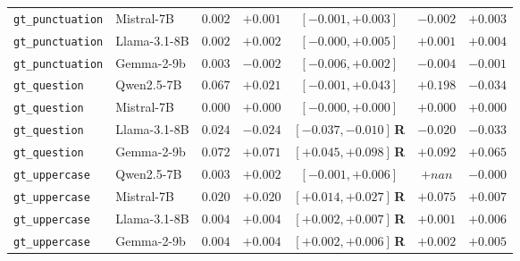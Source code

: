 \begin{table}[htbp]
\begin{tabular}{llccccc}
    \texttt{gt\_punctuation} & Mistral-7B & $0.002$ & $+0.001$ & $[-0.001, +0.003]$ & $-0.002$ & $+0.003$ \\
    \texttt{gt\_punctuation} & Llama-3.1-8B & $0.002$ & $+0.002$ & $[-0.000, +0.005]$ & $+0.001$ & $+0.004$ \\
    \texttt{gt\_punctuation} & Gemma-2-9b & $0.003$ & $-0.002$ & $[-0.006, +0.002]$ & $-0.004$ & $-0.001$ \\
    \texttt{gt\_question} & Qwen2.5-7B & $0.067$ & $+0.021$ & $[-0.001, +0.043]$ & $+0.198$ & $-0.034$ \\
    \texttt{gt\_question} & Mistral-7B & $0.000$ & $+0.000$ & $[-0.000, +0.000]$ & $+0.000$ & $+0.000$ \\
    \texttt{gt\_question} & Llama-3.1-8B & $0.024$ & $-0.024$ & $[-0.037, -0.010]$\,\textbf{R} & $-0.020$ & $-0.033$ \\
    \texttt{gt\_question} & Gemma-2-9b & $0.072$ & $+0.071$ & $[+0.045, +0.098]$\,\textbf{R} & $+0.092$ & $+0.065$ \\
    \texttt{gt\_uppercase} & Qwen2.5-7B & $0.003$ & $+0.002$ & $[-0.001, +0.006]$ & $+nan$ & $-0.000$ \\
    \texttt{gt\_uppercase} & Mistral-7B & $0.020$ & $+0.020$ & $[+0.014, +0.027]$\,\textbf{R} & $+0.075$ & $+0.007$ \\
    \texttt{gt\_uppercase} & Llama-3.1-8B & $0.004$ & $+0.004$ & $[+0.002, +0.007]$\,\textbf{R} & $+0.001$ & $+0.006$ \\
    \texttt{gt\_uppercase} & Gemma-2-9b & $0.004$ & $+0.004$ & $[+0.002, +0.006]$\,\textbf{R} & $+0.002$ & $+0.005$ \\
    \bottomrule
  \end{tabular}
\end{table}
